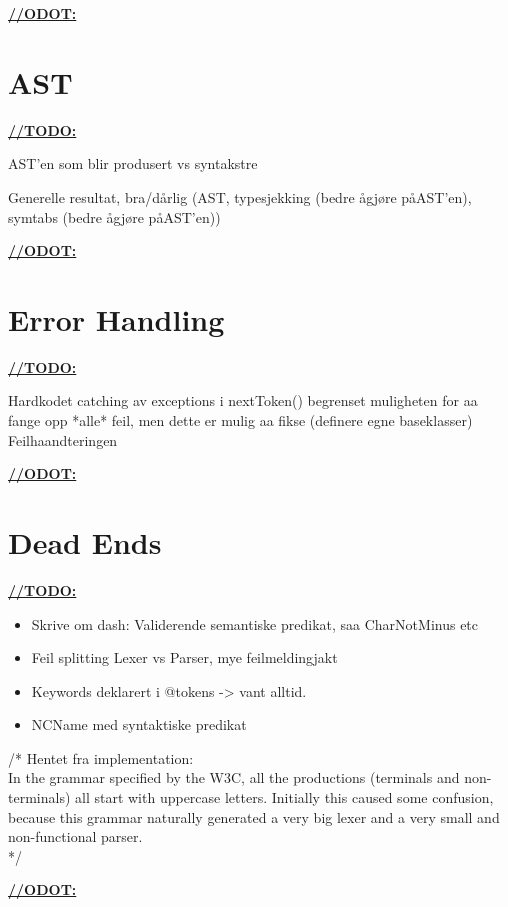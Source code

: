 \underline{\textbf{\LARGE //ODOT:}}

\section{AST}
\underline{\textbf{\LARGE //TODO:}}

AST'en som blir produsert vs syntakstre

Generelle resultat, bra/d\aa rlig (AST, typesjekking (bedre \aa gjøre p\aa AST'en),
symtabs (bedre \aa gjøre p\aa AST'en))

\underline{\textbf{\LARGE //ODOT:}}

\section{Error Handling}
\underline{\textbf{\LARGE //TODO:}}

Hardkodet catching av exceptions i nextToken() begrenset muligheten for aa
fange opp *alle* feil, men dette er mulig aa fikse (definere egne baseklasser)
Feilhaandteringen

\underline{\textbf{\LARGE //ODOT:}}

\section{Dead Ends}
\underline{\textbf{\LARGE //TODO:}}

\begin{itemize}
\item Skrive om dash: Validerende semantiske predikat, saa CharNotMinus etc
\item Feil splitting Lexer vs Parser, mye feilmeldingjakt
\item Keywords deklarert i @tokens -> vant alltid.

\item NCName med syntaktiske predikat
\end{itemize}

/* Hentet fra implementation: \\
In the grammar specified by the W3C, all the productions (terminals and
non-terminals) all start with uppercase letters. Initially this caused some
confusion, because this grammar naturally generated a very big lexer and a very
small and non-functional parser. \\
*/

\underline{\textbf{\LARGE //ODOT:}}


